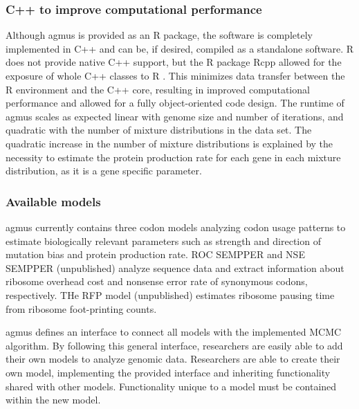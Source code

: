 \documentclass{bioinfo}
\newcommand{\package}{agmus } %
\begin{document}
\subsubsection*{C++ to improve computational performance}
Although \package is provided as an R package, the software is completely implemented in C++ and can be, if desired, compiled as a standalone software.
R does not provide native C++ support, but the R package Rcpp allowed for the exposure of whole C++ classes to R  \citep{rcpp_package}.
This minimizes data transfer between the R environment and the C++ core, resulting in improved computational performance and allowed for a fully object-oriented code design. 
The runtime of \package scales as expected linear with genome size and number of iterations, and quadratic with the number of mixture distributions in the data set. The quadratic increase in the number of mixture distributions is explained by the necessity to estimate the protein production rate for each gene in each mixture distribution, as it is a gene specific parameter.  

\subsubsection*{Available models}
\package currently contains three codon models analyzing codon usage patterns to estimate biologically relevant parameters such as strength and direction of mutation bias and protein production rate. 
ROC SEMPPER \citep{gilchrist2015} and NSE SEMPPER (unpublished) analyze sequence data and extract information about ribosome overhead cost and nonsense error rate of synonymous codons, respectively. 
THe RFP model (unpublished) estimates ribosome pausing time from ribosome foot-printing counts.


\package defines an interface to connect all models with the implemented MCMC algorithm. 
By following this general interface, researchers are easily able to add their own models to analyze genomic data.
Researchers are able to create their own model, implementing the provided interface and inheriting functionality shared with other models.
Functionality unique to a model must be contained within the new model. 



\end{document}
